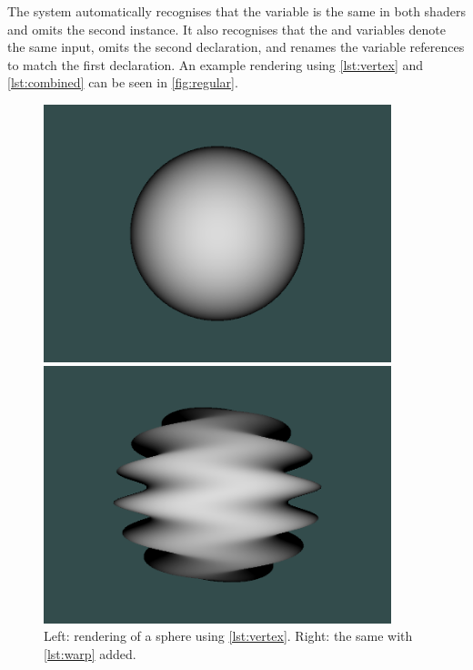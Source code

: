 \documentclass{sig-alternate}
\begin{document}
The system automatically recognises that the  variable is the same in both shaders and omits the second instance. It also recognises that the  and  variables denote the same input, omits the second declaration, and renames the variable references to match the first declaration. An example rendering using \autoref{lst:vertex} and \autoref{lst:combined} can be seen in \autoref{fig:regular}. \\

\begin{figure}[h]
  \begin{center}
    \begin{minipage}{.2\textwidth}
      \includegraphics[width=0.9\textwidth]{render-regular.png}
    \end{minipage}
    \begin{minipage}{.2\textwidth}
      \includegraphics[width=0.9\textwidth]{render-warped.png}
    \end{minipage}
  \end{center}
  \caption{Left: rendering of a sphere using \autoref{lst:vertex}. Right: the same with \autoref{lst:warp} added.}
  \label{fig:regular}
\end{figure}
\end{document}
